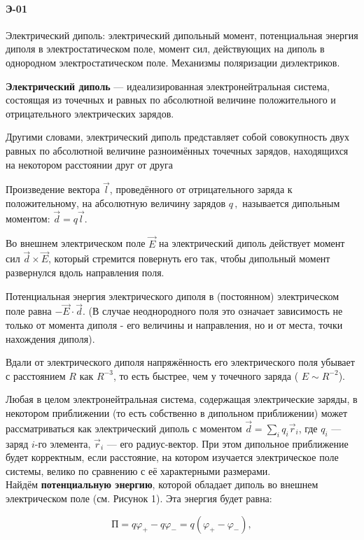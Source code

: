 \documentclass[__main__.tex]{subfiles}
\begin{document}
\paragraph{Э-01} 
Электрический диполь: электрический дипольный момент, потенциальная энергия диполя в электростатическом поле, момент сил, действующих на диполь в однородном электростатическом поле. Механизмы поляризации диэлектриков.

\textbf{Электрический диполь} — идеализированная электронейтральная система, состоящая из точечных и равных по абсолютной величине положительного и отрицательного электрических зарядов.

Другими словами, электрический диполь представляет собой совокупность двух равных по абсолютной величине разноимённых точечных зарядов, находящихся на некотором расстоянии друг от друга

Произведение вектора $ \vec l$, проведённого от отрицательного заряда к положительному, на абсолютную величину зарядов $ q\,,$ называется дипольным моментом: $\vec d=q\vec l$.

Во внешнем электрическом поле $\vec E$ на электрический диполь действует момент сил ${\vec d}\times{\vec E}$, который стремится повернуть его так, чтобы дипольный момент развернулся вдоль направления поля.

Потенциальная энергия электрического диполя в (постоянном) электрическом поле равна $-{\vec E}\cdot{\vec d}$. (В случае неоднородного поля это означает зависимость не только от момента диполя - его величины и направления, но и от места, точки нахождения диполя).

Вдали от электрического диполя напряжённость его электрического поля убывает с расстоянием $R$ как $R^{-3}$, то есть быстрее, чем у точечного заряда ( $E \sim R^{-2}$).

Любая в целом электронейтральная система, содержащая электрические заряды, в некотором приближении (то есть собственно в дипольном приближении) может рассматриваться как электрический диполь с моментом $\vec d = \sum_i q_i {\vec r}_i$, где $q_{i}$ — заряд $i$-го элемента, ${\vec r}_i$ — его радиус-вектор. При этом дипольное приближение будет корректным, если расстояние, на котором изучается электрическое поле системы, велико по сравнению с её характерными размерами.
\\
Найдём \textbf{потенциальную энергию}, которой обладает диполь во внешнем электрическом поле (см. Рисунок 1). Эта энергия будет равна:

\begin{equation}
\textit{П} = q\varphi_+ - q\varphi_- = q(\varphi_+ - \varphi_-),
\end{equation}
\end{document}
